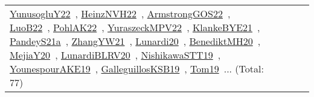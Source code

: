 {\begin{longtable}{lp{3cm}>{\raggedright\arraybackslash}p{6cm}>{\raggedright\arraybackslash}p{6cm}>{\raggedright\arraybackslash}p{8cm}}
\href{works/YunusogluY22.pdf}{YunusogluY22}~\cite{YunusogluY22}, \href{works/HeinzNVH22.pdf}{HeinzNVH22}~\cite{HeinzNVH22}, \href{works/ArmstrongGOS22.pdf}{ArmstrongGOS22}~\cite{ArmstrongGOS22}, \href{works/LuoB22.pdf}{LuoB22}~\cite{LuoB22}, \href{works/PohlAK22.pdf}{PohlAK22}~\cite{PohlAK22}, \href{works/YuraszeckMPV22.pdf}{YuraszeckMPV22}~\cite{YuraszeckMPV22}, \href{works/KlankeBYE21.pdf}{KlankeBYE21}~\cite{KlankeBYE21}, \href{works/PandeyS21a.pdf}{PandeyS21a}~\cite{PandeyS21a}, \href{works/ZhangYW21.pdf}{ZhangYW21}~\cite{ZhangYW21}, \href{works/Lunardi20.pdf}{Lunardi20}~\cite{Lunardi20}, \href{works/BenediktMH20.pdf}{BenediktMH20}~\cite{BenediktMH20}, \href{works/MejiaY20.pdf}{MejiaY20}~\cite{MejiaY20}, \href{works/LunardiBLRV20.pdf}{LunardiBLRV20}~\cite{LunardiBLRV20}, \href{works/NishikawaSTT19.pdf}{NishikawaSTT19}~\cite{NishikawaSTT19}, \href{works/YounespourAKE19.pdf}{YounespourAKE19}~\cite{YounespourAKE19}, \href{works/GalleguillosKSB19.pdf}{GalleguillosKSB19}~\cite{GalleguillosKSB19}, \href{works/Tom19.pdf}{Tom19}~\cite{Tom19}... (Total: 77)\\

\end{longtable}}
